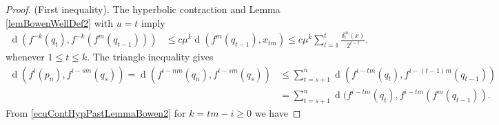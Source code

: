 \documentclass[10pt,a4paper]{amsart}
\DeclareMathOperator{\dist}{d}
\begin{document}
\begin{proof}
	(First inequality). The hyperbolic contraction and Lemma \ref{lemBowenWellDef2} with $u=t$ imply
	\begin{equation}
		\label{ecuContHypPastLemmaBowen2}
		\begin{array}{rl}
			\dist(f^{-k}(q_t),f^{-k}(f^m(q_{t-1})))
			& \displaystyle\leq
			c\mu^k\dist(f^m(q_{t-1}),x_{tm})
			\leq c\mu^k
			\sum_{l=1}^t\frac{\delta_l^m(x)}{2^{t-l}}.
		\end{array}
	\end{equation}
	whenever $1\leq t\leq k$.
	The triangle inequality gives
	\begin{align*}
		\dist(f^i(p_n),f^{i-sm}(q_s))
		= \dist(f^{i-nm}(q_n),f^{i-sm}(q_s))
		&\leq \sum_{t=s+1}^n\dist(f^{i-tm}(q_t),f^{i-(t-1)m}(q_{t-1}))\\
		& = \sum_{t=s+1}^n\dist(f^{i-tm}(q_t),f^{i-tm}(f^m(q_{t-1})).
	\end{align*}
	From \eqref{ecuContHypPastLemmaBowen2} for  $k=tm-i\geq 0$ we have


\end{proof}
\end{document}

